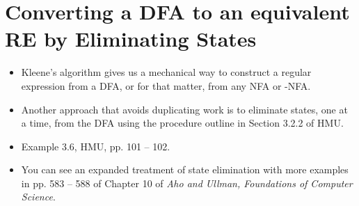 \documentclass[]{article}
\begin{document}
\section{Converting a DFA to an equivalent RE by Eliminating States}
  \begin{itemize}
    \item Kleene's algorithm gives us a mechanical way to construct a regular
    expression from a DFA, or for that matter, from any NFA or \textepsilon-NFA.
    \item Another approach that avoids duplicating work is to eliminate states,
    one at a time, from the DFA using the procedure outline in Section 3.2.2 of
    HMU.
    \item Example 3.6, HMU, pp. 101 -- 102.
    \item You can see an expanded treatment of state elimination with more
    examples in pp. 583 -- 588 of Chapter 10 of
    \emph{Aho and Ullman, Foundations of Computer Science}.
  \end{itemize}
\end{document}
